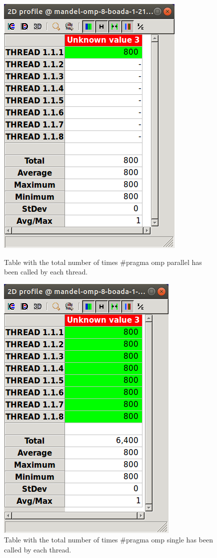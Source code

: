 \documentclass[12pt, a4paper]{article}
\begin{document}
\begin{figure}[H]
\centering
\begin{minipage}[t]{0.4\linewidth}
  \centering
  \includegraphics[scale=0.40]{./mandel-omp-21-parallel}
  \caption{Table with the total number of times \#pragma omp parallel has been called by each thread.}
  \label{fig:mandel-omp-21-parallel}
\end{minipage}%
\hspace{0.5cm}
\begin{minipage}[t]{0.4\linewidth}
  \centering
  \includegraphics[scale=0.40]{./mandel-omp-21-single}
  \caption{Table with the total number of times \#pragma omp single has been called by each thread.}
  \label{fig:mandel-omp-21-single}
\end{minipage}
\end{figure}
\end{document}
